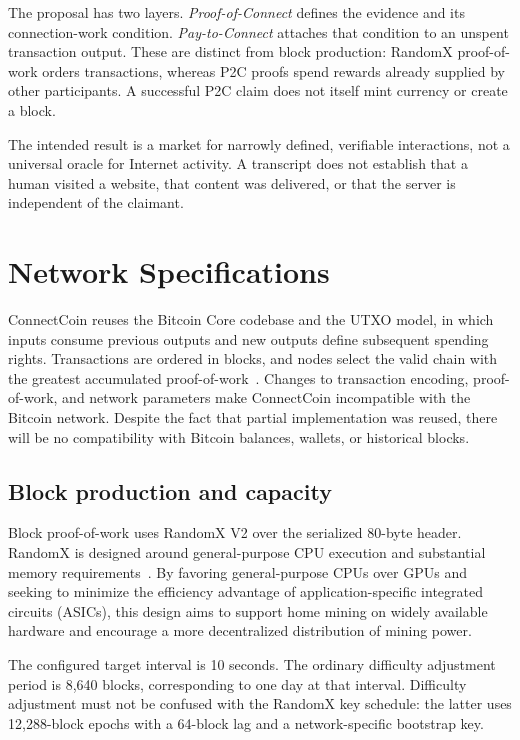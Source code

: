 \documentclass[11pt,a4paper]{article}
\begin{document}
The proposal has two layers. \emph{Proof-of-Connect} defines the evidence and
its connection-work condition. \emph{Pay-to-Connect} attaches that condition to
an unspent transaction output. These are distinct from block production:
RandomX proof-of-work orders transactions, whereas P2C proofs spend rewards
already supplied by other participants. A successful P2C claim does not itself
mint currency or create a block.

The intended result is a market for narrowly defined, verifiable interactions,
not a universal oracle for Internet activity. A transcript does not establish
that a human visited a website, that content was delivered, or that the server
is independent of the claimant.

\section{Network Specifications}

ConnectCoin reuses the Bitcoin Core codebase and the UTXO model, in which inputs
consume previous outputs and new outputs define subsequent spending rights.
Transactions are ordered in blocks, and nodes select the valid chain with the
greatest accumulated proof-of-work~\cite{bitcoin}. Changes to transaction encoding,
proof-of-work, and network parameters make ConnectCoin incompatible with the
Bitcoin network. Despite the fact that partial implementation was reused, there will be no compatibility with
Bitcoin balances, wallets, or historical blocks.

\subsection*{Block production and capacity}

Block proof-of-work uses RandomX V2 over the serialized 80-byte header. RandomX
is designed around general-purpose CPU execution and substantial memory
requirements~\cite{randomx}. By favoring general-purpose CPUs over GPUs and seeking
to minimize the efficiency advantage of application-specific integrated circuits
(ASICs), this design aims to support home mining on widely available hardware and
encourage a more decentralized distribution of mining power.

The configured target interval is 10 seconds. The ordinary difficulty adjustment
period is 8,640 blocks, corresponding to one day at that interval. Difficulty
adjustment must not be confused with the RandomX key schedule: the latter uses
12,288-block epochs with a 64-block lag and a network-specific bootstrap key.
\end{document}
